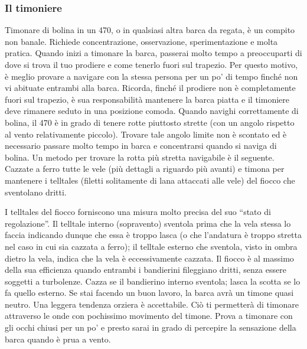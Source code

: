 \subsubsection{Il timoniere}
\label{subsubsec:IlTimoniere}
Timonare di bolina in un 470, o in qualsiasi altra barca da regata, è un compito
non banale. Richiede concentrazione, osservazione, sperimentazione e molta
pratica. Quando inizi a timonare la barca, passerai molto tempo a preoccuparti
di dove si trova il tuo prodiere e come tenerlo fuori sul trapezio. Per questo
motivo, è meglio provare a navigare con la stessa persona per un po' di tempo
finché non vi abituate entrambi alla barca. Ricorda, finché il prodiere non è
completamente fuori sul trapezio, è sua responsabilità mantenere la barca piatta
e il timoniere deve rimanere seduto in una posizione comoda. Quando navighi
correttamente di bolina, il 470 è in grado di tenere rotte piuttosto strette
(con un angolo rispetto al vento relativamente piccolo). Trovare tale angolo
limite non è scontato ed è necessario passare molto tempo in barca e
concentrarsi quando si naviga di bolina. Un metodo per trovare la rotta più
stretta navigabile è il seguente. Cazzate a ferro tutte le vele (più dettagli a
riguardo più avanti) e timona per mantenere i telltales (filetti solitamente di
lana attaccati alle vele) del fiocco che sventolano dritti. 

I telltales del fiocco forniscono una misura molto precisa del suo ``stato di
regolazione''. Il telltale interno (sopravento) sventola prima che la vela
stessa lo faccia indicando dunque che essa è troppo lasca (o che l'andatura è
troppo stretta nel caso in cui sia cazzata a ferro); il telltale esterno che
sventola, visto in ombra dietro la vela, indica che la vela è eccessivamente
cazzata. Il fiocco è al massimo della sua efficienza quando entrambi i
bandierini fileggiano dritti, senza essere soggetti a turbolenze. Cazza se il
bandierino interno sventola; lasca la scotta se lo fa quello esterno. Se stai
facendo un buon lavoro, la barca avrà un timone quasi neutro. Una leggera
tendenza orziera è accettabile. Ciò ti permetterà di timonare attraverso le onde
con pochissimo movimento del timone. Prova a timonare con gli occhi chiusi per
un po' e presto sarai in grado di percepire la sensazione della barca quando è
prua a vento.

